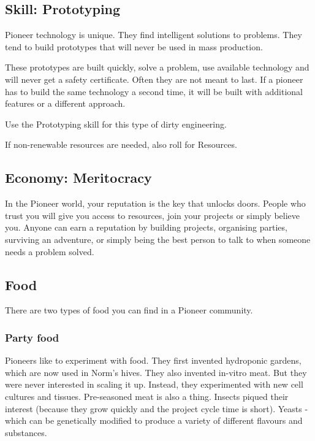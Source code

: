 \subsection{Skill: Prototyping}
\label{sec:Prototyping skill}

Pioneer technology is unique. They find intelligent solutions to problems. They tend to build prototypes that will never be used in mass production.

These prototypes are built quickly, solve a problem, use available technology and will never get a safety certificate.
Often they are not meant to last.
If a pioneer has to build the same technology a second time, it will be built with additional features or a different approach.

Use the Prototyping skill for this type of dirty engineering.

If non-renewable resources are needed, also roll for Resources.

\subsection{Economy: Meritocracy}
\label{sec:meritocracy}

In the Pioneer world, your reputation is the key that unlocks doors. People who trust you will give you access to resources, join your projects or simply believe you.
Anyone can earn a reputation by building projects, organising parties, surviving an adventure, or simply being the best person to talk to when someone needs a problem solved.

\subsection{Food}
\label{sec: pioneer food}

There are two types of food you can find in a Pioneer community.

\subsubsection{Party food}

Pioneers like to experiment with food. They first invented hydroponic gardens, which are now used in Norm's hives. They also invented in-vitro meat. But they were never interested in scaling it up. Instead, they experimented with new cell cultures and tissues. Pre-seasoned meat is also a thing.
Insects piqued their interest (because they grow quickly and the project cycle time is short). Yeasts - which can be genetically modified to produce a variety of different flavours and substances.

